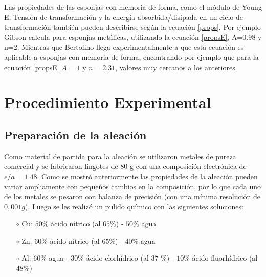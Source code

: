 \documentclass[a4paper,12pt,fleqn,twoside,openany]{book}
\begin{document}
Las propiedades de las esponjas con memoria de forma, como el módulo de Young E, Tensión de transformación y la energía absorbida/disipada en un ciclo de 
transformación también pueden describirse según la ecuación \ref{props}. Por ejemplo Gibson \cite{gibson} calcula para esponjas metálicas, utilizando la 
ecuación \ref{propsE}, A=0.98 y n=2. Mientras que Bertolino \cite{bertolino2011} llega experimentalmente a que esta ecuación es aplicable a esponjas 
con memoria de forma, encontrando por ejemplo que para la ecuación \ref{propsE} $A=1$ y $n=2.31$, valores muy cercanos a los anteriores.




\chapter{Procedimiento Experimental}



\section{Preparación de la aleación} \label{preparacion_aleacion}


Como material de partida para la aleación se utilizaron metales de pureza comercial y se fabricaron lingotes de 80 g con una composición electrónica de 
$e/a=1.48$. Como se mostró anteriormente las propiedades de la aleación pueden variar ampliamente 
con pequeños cambios en la composición, por lo que cada uno de los metales se pesaron con balanza de precisión (con una mínima resolución de $0,001g$). 
Luego se les realizó un pulido químico con las siguientes soluciones:
\begin{itemize}
 \item[$\circ$] Cu: $50 \%$ ácido nítrico (al $65 \%$) - $50 \%$ agua
 \item[$\circ$] Zn: $60 \%$ ácido nítrico (al $65 \%$) - $40 \%$ agua
 \item[$\circ$] Al: $60 \%$ agua - $30 \%$ ácido clorhídrico (al 37 \%) - $10 \%$ ácido fluorhídrico (al $48 \%$)
\end{itemize}
\end{document}
